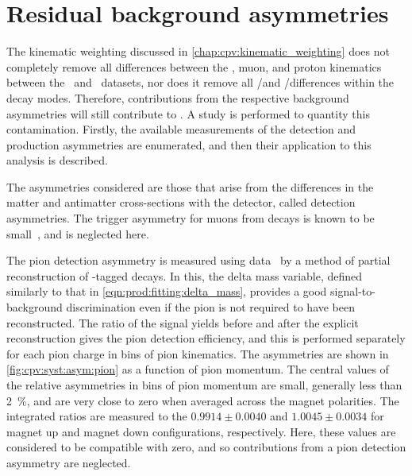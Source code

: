\begin{table}
  \centering
  \caption{%
    Differences between asymmetries measured with the nominal fit method and
    the sideband subtraction, measured for each data sub-sample and combination
    of sub-samples.
    The uncertainties quoted assume the values found by the two methods are
    fully correlated.
    The computation of the combinations, ``2011 + 2012'' and ``Average'', is
    defined in \cref{chap:cpv:results:combination}.
  }
  \label{tab:cpv:syst:sbs_differences}
  
\end{table}

\section{Residual background asymmetries}
\label{chap:cpv:syst:asym}

The kinematic weighting discussed in \cref{chap:cpv:kinematic_weighting} does
not completely remove all differences between the \PLambdab, muon, and proton
kinematics between the \pKK\ and \ppipi\ datasets, nor does it remove all
\PKminus/\PKplus and \Ppiminus/\Ppiplus differences within the decay modes.
Therefore, contributions from the respective background asymmetries will still
contribute to \dACP\@.
A study is performed to quantity this contamination.
Firstly, the available measurements of the detection and production asymmetries
are enumerated, and then their application to this analysis is described.

The asymmetries considered are those that arise from the differences in the
matter and antimatter cross-sections with the detector, called detection
asymmetries.
The trigger asymmetry for muons from \Pbottom decays is known to be
small~\cite{Aaij:2016yze}, and is neglected here.

The pion detection asymmetry is measured using 
data~\cite{Aaij:2012cy} by a method of partial reconstruction of
\PDstarp-tagged \decay{\PDzero}{\PKminus\Ppiplus\Ppiminus\Ppiplus} decays.
In this, the delta mass variable, defined similarly to that in
\cref{eqn:prod:fitting:delta_mass}, provides a good signal-to-background
discrimination even if the pion is not required to have been reconstructed.
The ratio of the signal yields before and after the explicit reconstruction
gives the pion detection efficiency, and this is performed separately for each
pion charge in bins of pion kinematics.
The asymmetries are shown in \cref{fig:cpv:syst:asym:pion} as a function of
pion momentum.
The central values of the relative asymmetries in bins of pion momentum are
small, generally less than \SI{2}{\percent}, and are very close to zero when
averaged across the magnet polarities.
The integrated ratios are measured to the $0.9914 \pm 0.0040$ and $1.0045 \pm
0.0034$ for magnet up and magnet down configurations, respectively.
Here, these values are considered to be compatible with zero, and so
contributions from a pion detection asymmetry are neglected.

